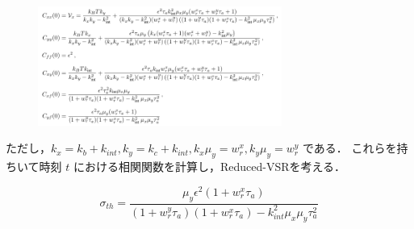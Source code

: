 \documentclass{jsarticle}
\numberwithin{equation}{section}
\theoremstyle{definition}
\begin{document}
\begin{figure}[H]
  \begin{center}  
  \includegraphics[width=8cm]{rbc_2.png}  
  \end{center}
\end{figure}

ただし，$k_x = k_b + k_{int}, k_y = k_c + k_{int}, k_x \mu_y = w^x_r, k_y \mu_y = w^y_r$ である．
これらを持ちいて時刻 $t$ における相関関数を計算し，Reduced-VSRを考える．

\begin{equation}
  \sigma_{th} = \frac{\mu_y \epsilon^2 (1 + w^x_r \tau_a)}{(1+w^y_r \tau_a)(1 + w^x_r \tau_a) - k_{int}^2 \mu_x \mu_y \tau^2_a}
\end{equation}

\end{document}
